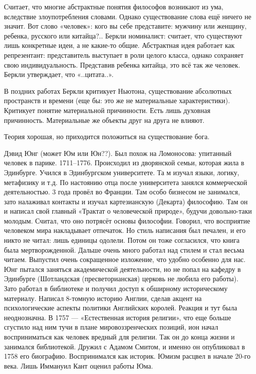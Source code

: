 Считает, что многие абстрактные понятия философов возникают из ума, вследствие злоупотребления словами. Однако существование слова ещё ничего не значит. Вот слово «человек»: кого вы себе представите: мужчину или женщину, ребенка, русского или китайца?.. Беркли номиналист: считает, что существуют лишь конкретные идеи, а не какие-то общие. Абстрактная идея работает как репрезентант: представитель выступает в роли целого класса, однако сохраняет свою индивидуальность. Представив ребенка китайца, это всё так же человек.
Беркли утверждает, что «..цитата..».

В поздних работах Беркли критикует Ньютона, существование абсолютных пространств и времени (еще бы: это же не материальные характеристики).  Критикует понятие материальной причинности. Есть лишь духовная причинность. Материальные же объекты друг на друга не влияют. 

Теория хорошая, но приходится положиться на существование бога.

Дэвид Юнг (может Юм или Юн??). Был похож на Ломоносова: упитанный человек в парике. 1711--1776. Происходил из дворянской семьи, которая жила в Эдинбурге. Учился в Эдинбургском университете. Та м изучал языки, логику, метафизику и т.д. По настоянию отца после университета занялся коммерческой деятельностью. 3 года провёл во Франции. Там особо бизнесом не занимался, зато налаживал контакты и изучал картезианскую (Декарта) философию. Там он и написал свой главный «Трактат о человеческой природе», будучи довольно-таки молодым. Считал, что оно потрясёт основы философии. Говорил, что восприятие человеком мира накладывает отпечаток. Но стиль написания был печален, и его никто не читал: лишь единицы одолели. Потом он тоже согласился, что книга была мертворожденной. Дальше очень много работал над стилем и стал весьма читаем. Выпустил очень сокращенное изложение, что удобно особенно для нас. Юнг пытался заняться академической деятельности, но не попал на кафедру в Эдинбурге (Шотландская (пресветорианская) церковь не любила его работы). Зато работал в библиотеке и получил доступ к обширному историческому материалу. Написал 8-томную историю Англии, сделав акцент на психологические аспекты политики Английских королей. Реакция и тут была неоднозначна. В 1757 --- «Естественная история религии», что еще больше сгустило над ним тучи в плане мировоззренческих позиций, ион начал восприниматься как человек вредный для религии. Так он до конца жизни и занимался библиотекой. Дружил с Адамом Смитом, и именно он опубликовал в 1758 его биографию. Воспринимался как историк. Юмизм расцвел в начале 20-го века. Лишь Иммануил Кант оценил работы Юма.